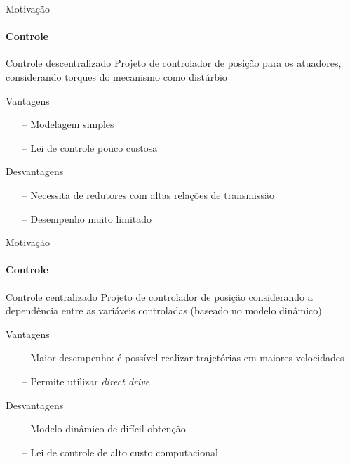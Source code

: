 \documentclass[25pt,landscape]{beamer}
\begin{document}
\begin{frame}{Motiva\c{c}\~ao}
    \framesubtitle{Controle}
    \pause
    \begin{block}{Controle descentralizado}
    	\pause
        Projeto de controlador de posi\c{c}\~ao para os atuadores, considerando torques do mecanismo como dist\'urbio    
    \end{block}
    \pause
    \begin{exampleblock}{Vantagens}
        \begin{itemize}
            \item[--] Modelagem simples
            \item[--] Lei de controle pouco custosa
        \end{itemize}
    \end{exampleblock}
    \pause
    \begin{exampleblock}{Desvantagens}
        \begin{itemize}
            \item[--] Necessita de redutores com altas rela\c{c}\~oes de transmiss\~ao
            \item[--] Desempenho muito limitado
        \end{itemize}
    \end{exampleblock}
\end{frame}

\begin{frame}{Motiva\c{c}\~ao}
    \framesubtitle{Controle}
    \begin{block}{Controle centralizado}
    	\pause
        Projeto de controlador de posi\c{c}\~ao considerando a depend\^encia entre as vari\'aveis controladas (baseado no modelo din\^amico)
    \end{block}
    \pause
    \begin{exampleblock}{Vantagens}
        \begin{itemize}
            \item[--] Maior desempenho: \'e poss\'ivel realizar trajet\'orias em maiores velocidades
            \item[--] Permite utilizar {\em direct drive}
        \end{itemize}
    \end{exampleblock}
    \pause
    \begin{exampleblock}{Desvantagens}
        \begin{itemize}
            \item[--] Modelo din\^amico de dif\'icil obten\c{c}\~ao
            \item[--] Lei de controle de alto custo computacional
        \end{itemize}
    \end{exampleblock}
\end{frame}
\end{document}

